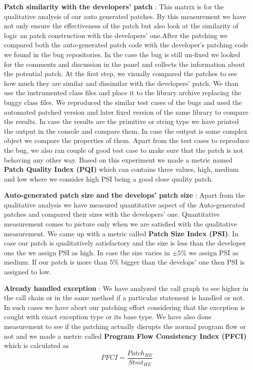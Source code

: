 \begin{mylist}

\item \textbf{Patch similarity with the developers' patch} : This matrix is for
the qualitative analysis of our auto generated patches. By this measurement we
have not only ensure the effectiveness of the patch but also look at the
similarity of logic an patch construction with the developers' one.After the
patching we compared both the auto-generated patch code with the developer's
patching code we found in the bug repositories. In the case the bug is still
un-fixed we looked for the comments and discussion in the panel and collects
the information about the potential patch. At the first step, we visually
compared the patches to see how much they are similar and dissimilar with the
developers' patch. We than use the instrumented class files and place it to the
library archive replacing the buggy class files. We reproduced the similar test
cases of the bugs and used the automated patched version and later fixed version
of the same library to compare the results. In case the results are the primitive
or string type we have printed the output in the console and compare them. In
case the output is some complex object we compare the properties of them. Apart
from the test cases to reproduce the bug, we also ran couple of good test case
to make sure that the patch is not behaving any other way. Based on this
experiment we made a metric named \textbf{Patch Quality Index (PQI)} which
can contains three values, high, medium and low where we consider high PSI being
a good close quality patch.

\item \textbf{Auto-generated patch size and the develops' patch size} : Apart
from the qualitative analysis we have measured quantitative aspect of the
Auto-generated patches and compared their sizes with the developers' one.
Quantitative measurement comes to picture only when we are satisfied with the
qualitative measurement. We came up with a metric called \textbf{Patch Size
Index (PSI)}. In case our patch is qualitatively satisfactory and the size is
less than the developer one the we assign PSI as high. In case the size varies
in $\pm5\%$ we assign PSI as medium. If our patch is more than $5\%$ bigger than
the develops' one then PSI is assigned to low.

\item \textbf{Already handled exception} : We have analyzed the call graph to
see higher in the call chain or in the same method if a particular statement is
handled or not. In such cases we have abort our patching effort considering that
the exception is caught with exact exception type or its base type. We have also
done measurement to see if the patching actually disrupts the normal program
flow or not and we made a metric called \textbf{Program Flow Consistency Index
(PFCI)} which is calculated as
$$PFCI = \frac{Patch_{HE}}{Stmt_{HE}}$$


\end{mylist}
